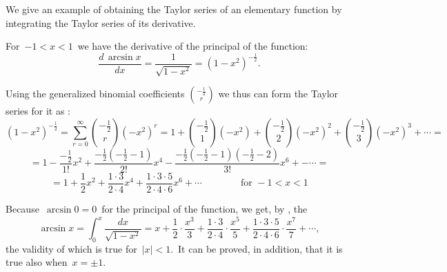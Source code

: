 \documentclass[12pt]{article}
\begin{document}
We give an example of obtaining the Taylor series  of an elementary function by integrating the Taylor series of its derivative.

For\, $-1 < x < 1$\, we have the derivative of the principal  of the  function:
$$\frac{d\,\arcsin{x}}{dx} = \frac{1}{\sqrt{1\!-\!x^2}} = 
(1\!-\!x^2)^{-\frac{1}{2}}.$$

Using the generalized binomial coefficients ${-\frac{1}{2} \choose r}$ we thus can form the Taylor series for it as : 
$$(1\!-\!x^2)^{-\frac{1}{2}} = \sum_{r = 0}^\infty{-\frac{1}{2} \choose r}(-x^2)^r = 
1\!+\!{-\frac{1}{2}\choose 1}(-x^2)\!+\!{-\frac{1}{2}\choose 2}(-x^2)^2\!+\!
{-\frac{1}{2}\choose 3}(-x^2)^3\!+\!\cdots =$$
$$ =1\!-\!\frac{-\frac{1}{2}}{1!}x^2\!+
\!\frac{-\frac{1}{2}(-\frac{1}{2}\!-\!1)}{2!}x^4\!
-\!\frac{-\frac{1}{2}(-\frac{1}{2}\!-\!1)(-\frac{1}{2}\!-\!2)}{3!}x^6\!+-\cdots =$$
$$ = 1\!+\!\frac{1}{2}x^2\!+\!\frac{1\cdot 3}{2\cdot 4}x^4\!+\!
\frac{1\cdot 3\cdot 5}{2\cdot 4\cdot 6}x^6\!+\!\cdots
\quad\quad\quad\quad \mathrm{for}\,\, -1 < x < 1$$

Because\, $\arcsin{0} = 0$\, for the principal  of the function, we get, by , the 
$$\arcsin{x} = \int_0^x\frac{dx}{\sqrt{1\!-\!x^2}} = 
  x\!+\!\frac{1}{2}\!\cdot\!\frac{x^3}{3}\!+
\!\frac{1\!\cdot\!3}{2\!\cdot\!4}\!\cdot\!\frac{x^5}{5}\!+\!
\frac{1\!\cdot\!3\cdot\!5}{2\!\cdot\!4\cdot\!6}\!\cdot\!\frac{x^7}{7}\!+\!\cdots,$$
the validity of which is true for\, $|x| < 1$.\, It can be proved, in addition, that it is true also when\, $x = \pm 1$.
\end{document}
